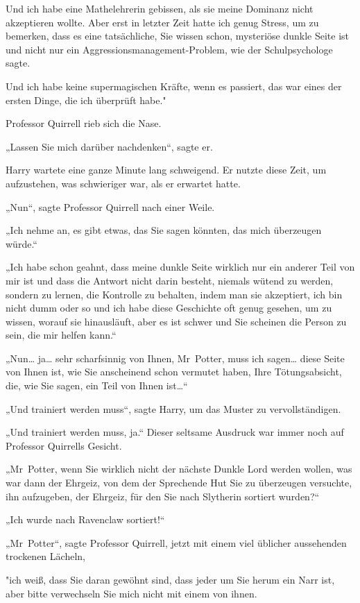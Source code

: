 {Und ich habe eine Mathelehrerin gebissen, als sie meine Dominanz nicht akzeptieren wollte. Aber erst in letzter Zeit hatte ich genug Stress, um zu bemerken, dass es eine tatsächliche, Sie wissen schon, mysteriöse dunkle Seite ist und nicht nur ein Aggressionsmanagement-Problem, wie der Schulpsychologe sagte.

Und ich habe keine supermagischen Kräfte, wenn es passiert, das war eines der ersten Dinge, die ich überprüft habe."

Professor Quirrell rieb sich die Nase.

„Lassen Sie mich darüber nachdenken“, sagte er.

Harry wartete eine ganze Minute lang schweigend. Er nutzte diese Zeit, um aufzustehen, was schwieriger war, als er erwartet hatte.

„Nun“, sagte Professor Quirrell nach einer Weile.

„Ich nehme an, es gibt etwas, das Sie sagen könnten, das mich überzeugen würde.“

„Ich habe schon geahnt, dass meine dunkle Seite wirklich nur ein anderer Teil von mir ist und dass die Antwort nicht darin besteht, niemals wütend zu werden, sondern zu lernen, die Kontrolle zu behalten, indem man sie akzeptiert, ich bin nicht dumm oder so und ich habe diese Geschichte oft genug gesehen, um zu wissen, worauf sie hinausläuft, aber es ist schwer und Sie scheinen die Person zu sein, die mir helfen kann.“

„Nun… ja… sehr scharfsinnig von Ihnen, Mr~Potter, muss ich sagen… diese Seite von Ihnen ist, wie Sie anscheinend schon vermutet haben, Ihre Tötungsabsicht, die, wie Sie sagen, ein Teil von Ihnen ist…“

„Und trainiert werden muss“, sagte Harry, um das Muster zu vervollständigen.

„Und trainiert werden muss, ja.“ Dieser seltsame Ausdruck war immer noch auf Professor Quirrells Gesicht.

„Mr~Potter, wenn Sie wirklich nicht der nächste Dunkle Lord werden wollen, was war dann der Ehrgeiz, von dem der Sprechende Hut Sie zu überzeugen versuchte, ihn aufzugeben, der Ehrgeiz, für den Sie nach Slytherin sortiert wurden?“

„Ich wurde nach Ravenclaw sortiert!“

„Mr~Potter“, sagte Professor Quirrell, jetzt mit einem viel üblicher aussehenden trockenen Lächeln,

"ich weiß, dass Sie daran gewöhnt sind, dass jeder um Sie herum ein Narr ist, aber bitte verwechseln Sie mich nicht mit einem von ihnen.

}
